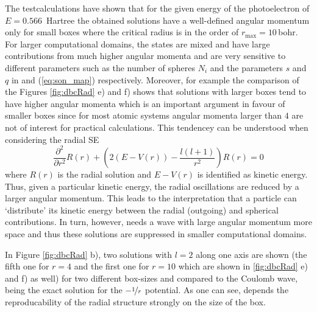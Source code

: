 The testcalculations have shown that for the given energy of the photoelectron of $E=0.566\,$ Hartree the obtained solutions have a well-defined angular momentum only for small boxes where the critical radius is in the order of $r_\text{max}=10\,$bohr.
For larger computational domains, the states are mixed and have large contributions from much higher angular momenta and are very sensitive to different parameters such as the number of spheres $N_i$ and the parameters $s$ and $q$ in   and (\ref{eq:son_map}) respectively.
Moreover, for example the comparison of the Figures \ref{fig:dbcRad} e) and f) shows that solutions with larger boxes tend to have higher angular momenta which is an important argument in favour of smaller boxes since for most atomic systems angular momenta larger than $4$ are not of interest for practical calculations.
This tendencey can be understood when considering the radial SE \cite{Lifshitz}
\begin{equation}
\frac{\partial^2}{\partial r^2} R(r) + \left(2\left(E-V(r)\right) -\frac{l(l+1)}{r^2}\right) R(r)=0
\end{equation}
where $R(r)$ is the radial solution and $E-V(r)$ is identified as kinetic energy.
Thus, given a particular kinetic energy, the radial oscillations are reduced by a larger angular momentum.
This leads to the interpretation that a particle can `distribute' its kinetic energy between the radial (outgoing) and spherical contributions.
In turn, however, needs a wave with large angular momentum more space and thus these solutions are suppressed in smaller computational domains.

In Figure \ref{fig:dbcRad} b), two solutions with $l=2$ along one axis are shown (the fifth one for $r=4$ and the first one for $r=10$ which are shown in \ref{fig:dbcRad} e) and f) as well) for two different box-sizes and compared to the Coulomb wave, being the exact solution for the $-\nicefrac{1}{r}$ potential.
As one can see, depends the reproducability of the radial structure strongly on the size of the box.


